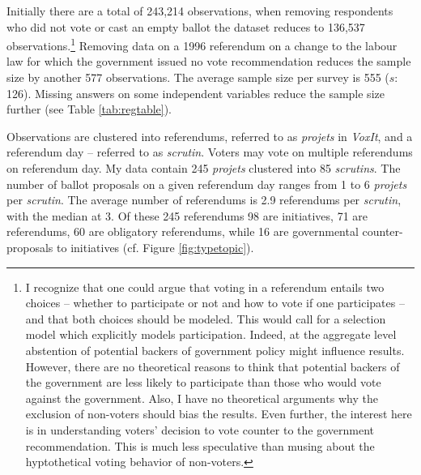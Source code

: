 \documentclass[11pt,a4paper]{article}\usepackage[]{graphicx}\usepackage[]{color}
\begin{document}
    Initially there are a total of 243,214 observations, when removing respondents who did not vote or cast an empty ballot the dataset reduces to 136,537 
    observations.\footnote{I recognize that one could argue that voting in a referendum entails two choices -- whether to participate or not and how to vote if one participates -- and that both choices should be modeled. This would call for a selection model which explicitly models participation. Indeed, at the aggregate level abstention of potential backers of government policy might influence results. However, there are no theoretical reasons to think that potential backers of the government are less likely to participate than those who would vote against the government. Also, I have no theoretical arguments why the exclusion of non-voters should bias the results. Even further, the interest here is in understanding voters' decision to vote counter to the government recommendation. This is much less speculative than musing about the hyptothetical voting behavior of non-voters.} Removing data on a 1996 referendum on a change to the labour law for which the government issued no vote recommendation reduces the sample size by another 577 observations. The average sample size per survey is 555 ($s$: 126). Missing answers on some independent variables reduce the sample size further (see Table \ref{tab:regtable}).
    
    Observations are clustered into referendums, referred to as \textit{projets} in \textit{VoxIt}, and a referendum day -- referred to as \textit{scrutin}. Voters may vote on multiple referendums on referendum day. My data contain 245 \textit{projets} clustered into 85 \textit{scrutins}. The number of ballot proposals on a given referendum day ranges from 1 to 6 \textit{projets} per \textit{scrutin}. The average number of referendums is 2.9 referendums per \textit{scrutin}, with the median at 3. Of these 245 referendums 98 are initiatives, 71 are referendums, 60 are obligatory referendums, while 16 are governmental counter-proposals to initiatives (cf. Figure \ref{fig:typetopic}).
    
\end{document}
